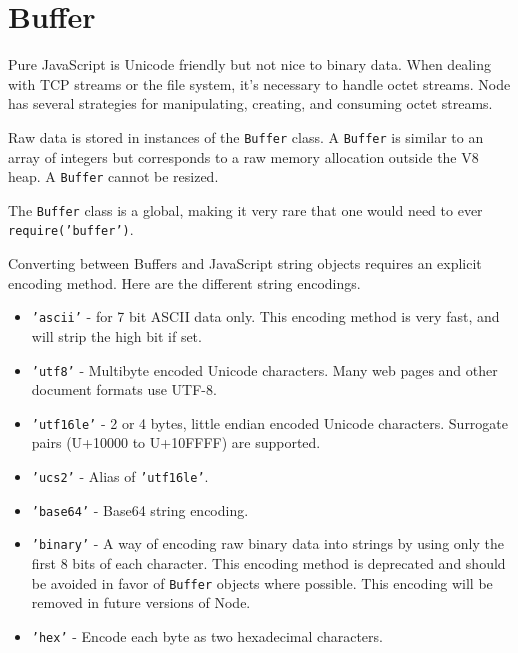 \section{Buffer}\label{buffer}

\begin{Shaded}
\begin{Highlighting}[]
 
\end{Highlighting}
\end{Shaded}

Pure JavaScript is Unicode friendly but not nice to binary data. When
dealing with TCP streams or the file system, it's necessary to handle
octet streams. Node has several strategies for manipulating, creating,
and consuming octet streams.

Raw data is stored in instances of the \texttt{Buffer} class. A
\texttt{Buffer} is similar to an array of integers but corresponds to a
raw memory allocation outside the V8 heap. A \texttt{Buffer} cannot be
resized.

The \texttt{Buffer} class is a global, making it very rare that one
would need to ever \texttt{require('buffer')}.

Converting between Buffers and JavaScript string objects requires an
explicit encoding method. Here are the different string encodings.

\begin{itemize}
\item
  \texttt{'ascii'} - for 7 bit ASCII data only. This encoding method is
  very fast, and will strip the high bit if set.
\item
  \texttt{'utf8'} - Multibyte encoded Unicode characters. Many web pages
  and other document formats use UTF-8.
\item
  \texttt{'utf16le'} - 2 or 4 bytes, little endian encoded Unicode
  characters. Surrogate pairs (U+10000 to U+10FFFF) are supported.
\item
  \texttt{'ucs2'} - Alias of \texttt{'utf16le'}.
\item
  \texttt{'base64'} - Base64 string encoding.
\item
  \texttt{'binary'} - A way of encoding raw binary data into strings by
  using only the first 8 bits of each character. This encoding method is
  deprecated and should be avoided in favor of \texttt{Buffer} objects
  where possible. This encoding will be removed in future versions of
  Node.
\item
  \texttt{'hex'} - Encode each byte as two hexadecimal characters.
\end{itemize}

